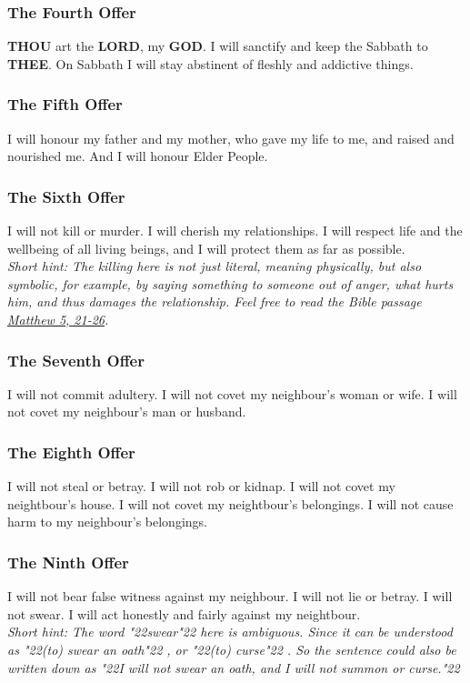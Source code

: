 \documentclass[10pt,a5paper]{article}
\newcommand{\God}[0]{\textbf{GOD}}
\newcommand{\Lord}[0]{\textbf{LORD}}
\newcommand{\Thee}[0]{\textbf{THEE}}
\newcommand{\Thou}[0]{\textbf{THOU}}
\newcommand{\q}[1]{\char"22{#1}\char"22 }
\begin{document}
	\subsubsection{The Fourth Offer}
		{\Thou} art the {\Lord},
		my {\God}.
		I will sanctify and keep the Sabbath to {\Thee}.
		On Sabbath I will stay abstinent of fleshly
		and addictive things.
		
	\subsubsection{The Fifth Offer}
		I will honour my father and my mother,
		who gave my life to me,
		and raised and nourished me.
		And I will honour Elder People.
			
	\subsubsection{The Sixth Offer} \label{TheSixthOffer}
		I will not kill or murder.
		I will cherish my relationships.
		I will respect life and the wellbeing of all living beings,
		and I will protect them as far as possible.
		\\
		\textit{Short hint:
		The killing here is not just literal,
		meaning physically,
		but also symbolic,
		for example,
		by saying something to someone out of anger,
		what hurts him,
		and thus damages the relationship.
		Feel free to read the Bible passage \href{https://www.die-bibel.de/bibeln/online-bibeln/lesen/ESV/MAT.5/Matthew-5}{Matthew 5, 21-26}.}
		
	\subsubsection{The Seventh Offer}
		I will not commit adultery.
		I will not covet my neighbour's woman or wife.
		I will not covet my neighbour's man or husband.
		
	\subsubsection{The Eighth Offer}
		I will not steal or betray.
		I will not rob or kidnap.
		I will not covet my neightbour's house.
		I will not covet my neightbour's belongings.
		I will not cause harm to my neighbour's belongings.
		
	\subsubsection{The Ninth Offer} \label{TheNinthOffer}
		I will not bear false witness against my neighbour.
		I will not lie or betray.
		I will not swear.
		I will act honestly and fairly against my neightbour.
		\\
		\textit{Short hint:
		The word \q{swear} here is ambiguous.
		Since it can be understood as \q{(to) swear an oath},
		or \q{(to) curse}.
		So the sentence could also be written down as
		\q{I will not swear an oath, and I will not summon or curse.}}
		
\end{document}
